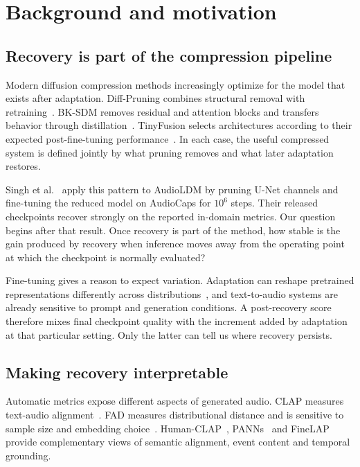 \documentclass{article}
\begin{document}
\section{Background and motivation}
\subsection{Recovery is part of the compression pipeline}
Modern diffusion compression methods increasingly optimize for the model that exists after adaptation. Diff-Pruning combines structural removal with retraining~\cite{fang2023diffpruning}. BK-SDM removes residual and attention blocks and transfers behavior through distillation~\cite{kim2024bksdm}. TinyFusion selects architectures according to their expected post-fine-tuning performance~\cite{fang2025tinyfusion}. In each case, the useful compressed system is defined jointly by what pruning removes and what later adaptation restores.

Singh et al.~\cite{singh2026pruning} apply this pattern to AudioLDM by pruning U-Net channels and fine-tuning the reduced model on AudioCaps for $10^{6}$ steps. Their released checkpoints recover strongly on the reported in-domain metrics. Our question begins after that result. Once recovery is part of the method, how stable is the gain produced by recovery when inference moves away from the operating point at which the checkpoint is normally evaluated?

Fine-tuning gives a reason to expect variation. Adaptation can reshape pretrained representations differently across distributions~\cite{kumar2022finetuning}, and text-to-audio systems are already sensitive to prompt and generation conditions. A post-recovery score therefore mixes final checkpoint quality with the increment added by adaptation at that particular setting. Only the latter can tell us where recovery persists.

\subsection{Making recovery interpretable}
Automatic metrics expose different aspects of generated audio. CLAP measures text-audio alignment~\cite{wu2023clap}. FAD measures distributional distance and is sensitive to sample size and embedding choice~\cite{kilgour2019fad,gui2024fad,chung2025kad}. Human-CLAP~\cite{takano2025humanclap}, PANNs~\cite{kong2020panns} and FineLAP~\cite{li2026finelap} provide complementary views of semantic alignment, event content and temporal grounding.
\end{document}
